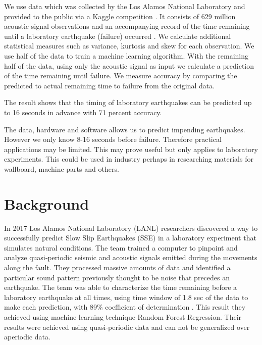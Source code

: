 \documentclass[]{llncs} %
\begin{document}
We use data which was collected by the Los Alamos National Laboratory and provided to the public via a Kaggle competition \cite{kaggle}. It consists of 629 million acoustic signal observations and an accompanying record of the time remaining until a laboratory earthquake (failure) occurred \cite{Bertrand}. We calculate additional statistical measures such as variance, kurtosis and skew for each observation. We use half of the data to train a machine learning algorithm. With the remaining half of the data, using only the acoustic signal as input we calculate a prediction of the time remaining until failure. We measure  accuracy by comparing the predicted to actual remaining time to failure from the original data. \par

The result shows that the timing of laboratory earthquakes can be predicted up to 16 seconds in advance with 71 percent accuracy.\par

The data, hardware and software allows us to predict impending earthquakes. However we only know 8-16 seconds before failure. Therefore practical applications may be limited. This may prove useful but only applies to laboratory experiments. This could be used in industry perhaps in researching materials for wallboard, machine parts and others.\par


\section{Background}
In 2017 Los Alamos National Laboratory (LANL) researchers discovered a way to successfully predict Slow Slip Earthquakes (SSE) in a laboratory experiment that simulates natural conditions. The team trained a computer to pinpoint and analyze quasi‐periodic seismic and acoustic signals emitted during the movements along the fault. They processed massive amounts of data and identified a particular sound pattern previously thought to be noise that precedes an earthquake. The team was able to characterize the time remaining before a laboratory earthquake at all times, using time window of 1.8 sec of the data to make each prediction, with 89\% coefficient of determination \cite{LANLNews}. This result they achieved using machine learning technique Random Forest Regression. Their results were achieved using quasi‐periodic data and can not be generalized over aperiodic data. \par
\end{document}
